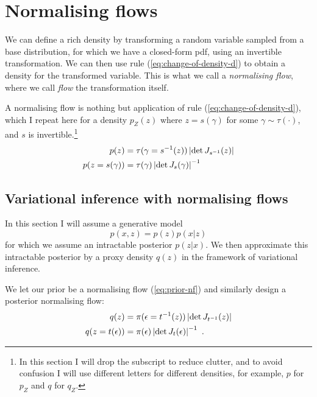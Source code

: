 \section{Normalising flows}

We can define a rich density by transforming a random variable sampled from a base distribution, for which we have a closed-form pdf, using an invertible transformation. We can then use rule (\ref{eq:change-of-density-d}) to obtain a density for the transformed variable. This is what we call a \emph{normalising flow}, where we call \emph{flow} the transformation itself. 

A normalising flow is nothing but application of rule (\ref{eq:change-of-density-d}), which I repeat here for a density $p_Z(z)$ where $z = s(\gamma)$ for some $\gamma \sim \tau(\cdot)$, and $s$ is invertible.\footnote{In this section I will drop the subscript to reduce clutter, and to avoid confusion I will use different letters for different densities, for example, $p$ for $p_Z$ and $q$ for $q_Z$.}
\begin{subequations}\label{eq:prior-nf}
\begin{align}
p(z) &= \tau(\gamma = {s}^{-1}(z)) \left| \det J_{{s}^{-1}}(z) \right| \\
p(z = s(\gamma)) &= \tau(\gamma) \left| \det J_{s}(\gamma) \right|^{-1}
\end{align}
\end{subequations}

\subsection{Variational inference with normalising flows}

In this section I will assume a generative model 
\begin{equation}
    p(x, z) = p(z)p(x|z)
\end{equation}
for which we assume an intractable posterior $p(z|x)$.
We then approximate this intractable posterior by a proxy density $q(z)$ in the framework of variational inference.

We let our prior be a normalising flow (\ref{eq:prior-nf}) and similarly design a posterior normalising flow:
\begin{subequations}
\begin{align}
q(z) &= \pi(\epsilon = {t}^{-1}(z)) \left| \det J_{{t}^{-1}}(z) \right| \\
q(z = t(\epsilon)) &= \pi(\epsilon) \left| \det J_{t}(\epsilon) \right|^{-1} ~.
\end{align}
\end{subequations}

